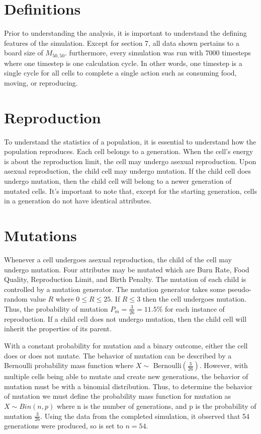 \documentclass[12pt]{article}
\begin{document}
\section{Definitions}

	Prior to understanding the analysis, it is important to understand the defining features of the simulation.
	Except for section 7, all data shown pertains to a board size of $M_{50, 50}$. 
	furthermore, every simulation was run with 7000 timesteps where one timestep is one calculation cycle. 
	In other words, one timestep is a single cycle for all cells to complete a single action such as consuming food, moving, or reproducing.

\section{Reproduction}

	To understand the statistics of a population, it is essential to understand how the population reproduces. 
	Each cell belongs to a generation. 
	When the cell's energy is about the reproduction limit, the cell may undergo asexual reproduction. 
	Upon asexual reproduction, the child cell may undergo mutation. 
	If the child cell does undergo mutation, then the child cell will belong to a newer generation of mutated cells. 
	It's important to note that, except for the starting generation, cells in a generation do not have identical attributes.

\section{Mutations}

	Whenever a cell undergoes asexual reproduction, the child of the cell may undergo mutation. 
	Four attributes may be mutated which are Burn Rate, Food Quality, Reproduction Limit, and Birth Penalty. 
	The mutation of each child is controlled by a mutation generator. 
	The mutation generator takes some pseudo-random value $R$ where $0 \leq R \leq 25$. 
	If $R \leq 3$ then the cell undergoes mutation. Thus, the probability of mutation $P_{m} = \frac{3}{26} = 11.5\%$ for each instance of reproduction. 
	If a child cell does not undergo mutation, then the child cell will inherit the properties of its parent. 

	With a constant probability for mutation and a binary outcome, either the cell does or does not mutate. 
	The behavior of mutation can be described by a Bernoulli probability mass function where $X\sim$ Bernoulli$(\frac{3}{26})$. 
	However, with multiple cells being able to mutate and create new generations, the behavior of mutation must be with a binomial distribution.
	Thus, to determine the behavior of mutation we must define the probability mass function for mutation as $X \sim Bin(n, p)$ where n is the number of generations, 
	and p is the probability of mutation $\frac{3}{26}$. Using the data from the completed simulation, it observed that 54 generations were produced, so is set to $n = 54$.
\end{document}
